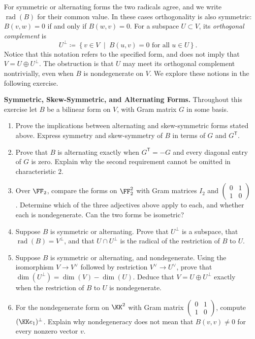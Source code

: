 \documentclass[12pt,reqno]{amsart}
\DeclareMathOperator{\rad}{rad}
\begin{document}
For symmetric or alternating forms the two radicals agree, and we write $\rad(B)$ for their common value. In these cases orthogonality is also symmetric: $B(v,w)=0$ if and only if $B(w,v)=0$. For a subspace $U\subset V$, its \emph{orthogonal complement} is
\[
U^{\perp}\coloneqq\left\{v\in V \;\; \big| \;\; B(u,v)=0\text{ for all }u\in U\right\}.
\]
Notice that this notation refers to the specified form, and does not imply that $V=U\oplus U^{\perp}$. The obstruction is that $U$ may meet its orthogonal complement nontrivially, even when $B$ is nondegenerate on $V$. We explore these notions in the following exercise.

\hrulefill

\begin{problems}
\item\label{b:types} \textbf{Symmetric, Skew-Symmetric, and Alternating Forms.} Throughout this exercise let $B$ be a bilinear form on $V$, with Gram matrix $G$ in some basis.
\begin{enumerate}
\item Prove the implications between alternating and skew-symmetric forms stated above. Express symmetry and skew-symmetry of $B$ in terms of $G$ and $G^{\mathsf T}$.
\item Prove that $B$ is alternating exactly when $G^{\mathsf T}=-G$ and every diagonal entry of $G$ is zero. Explain why the second requirement cannot be omitted in characteristic $2$.
\item Over $\FF_2$, compare the forms on $\FF_2^2$ with Gram matrices $I_2$ and $\left(\begin{smallmatrix}0&1\\1&0\end{smallmatrix}\right)$. Determine which of the three adjectives above apply to each, and whether each is nondegenerate. Can the two forms be isometric?
\item Suppose $B$ is symmetric or alternating. Prove that $U^{\perp}$ is a subspace, that $\rad(B)=V^{\perp}$, and that $U\cap U^{\perp}$ is the radical of the restriction of $B$ to $U$.
\item Suppose $B$ is symmetric or alternating, and nondegenerate. Using the isomorphism $V\to V^{\vee}$ followed by restriction $V^{\vee}\to U^{\vee}$, prove that $\dim(U^{\perp})=\dim(V)-\dim(U)$. Deduce that $V=U\oplus U^{\perp}$ exactly when the restriction of $B$ to $U$ is nondegenerate.
\item For the nondegenerate form on $\KK^2$ with Gram matrix $\left(\begin{smallmatrix}0&1\\1&0\end{smallmatrix}\right)$, compute $(\KK e_1)^{\perp}$. Explain why nondegeneracy does not mean that $B(v,v)\ne0$ for every nonzero vector $v$.
\end{enumerate}
\end{problems}
\end{document}
